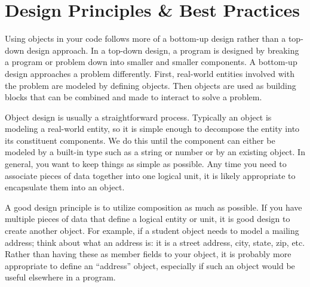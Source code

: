 \section{Design Principles \& Best Practices}

Using objects in your code follows more of a bottom-up design rather than
a top-down design approach.  In a top-down design, a program is designed
by breaking a program or problem down into smaller and smaller components.
A bottom-up design approaches a problem differently.  First, real-world
entities involved with the problem are modeled by defining objects.  
Then objects are used as building blocks that can be combined and made
to interact to solve a problem.

Object design is usually a straightforward process.  Typically an object
is modeling a real-world entity, so it is simple enough to decompose the
entity into its constituent components.  We do this until the component
can either be modeled by a built-in type such as a string or number or
by an existing object.  In general, you want to keep things as simple
as possible.  Any time you need to associate pieces of data together into
one logical unit, it is likely appropriate to encapsulate them
into an object.

A good design principle is to utilize composition as much as possible.
If you have multiple pieces of data that define a logical entity or 
unit, it is good design to create another object.  For example, if a
student object needs to model a mailing address; think about what an
address is: it is a street address, city, state, zip, etc.  Rather
than having these as member fields to your object, it is probably
more appropriate to define an ``address'' object, especially if such
an object would be useful elsewhere in a program.

